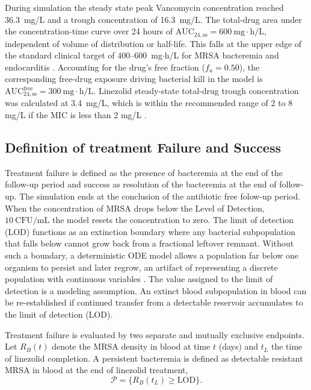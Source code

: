 \documentclass[utf8]{FrontiersinHarvard} %
\begin{document}
During simulation the steady state peak Vancomycin concentration reached 36.3~mg/L and a trough concentration of 16.3~mg/L.  The total-drug
area under the concentration-time curve over 24 hours of
$\mathrm{AUC}_{24,\mathrm{ss}} = 600~\mathrm{mg\cdot h/L}$,
independent of volume of distribution or half-life. This falls at the upper
edge of the standard clinical target of 400--600~mg$\cdot$h/L for MRSA
bacteremia and endocarditis \citep{rybak2020therapeutic}. Accounting for the drug's free fraction
($f_u = 0.50$), the corresponding free-drug exposure driving bacterial kill
in the model is $\mathrm{AUC}_{24,\mathrm{ss}}^{\text{free}} = 300~\mathrm{mg\cdot h/L}$.
Linezolid steady-state total-drug trough concentration was calculated at 3.4~mg/L,
which is within the recommended range of 2 to 8 mg/L if the MIC is less than 2 mg/L \citep{alsultan2019determining}.

\subsection{Definition of treatment Failure and Success}

Treatment failure is defined as the presence of bacteremia at the end of the follow-up period and success as resolution of the bacteremia at the end of follow-up.  The simulation ends at the conclusion of the antibiotic free folow-up period.  When the concentration of MRSA drops below the Level of Detection, $10~\mathrm{CFU/mL}$ the model resets the concentration to zero.  The limit of detection (LOD) functions as an extinction boundary where any bacterial subpopulation that falls below cannot grow back from a fractional leftover remnant. Without such a boundary, a deterministic ODE model allows a population far below one organism to persist and later regrow, an artifact of representing a discrete population with continuous variables \citep{Mollison1991,CampilloLobry2012}. The value assigned to the limit of detection is a modeling assumption.  An extinct blood subpopulation in blood can be re-established if continued transfer from a detectable reservoir accumulates to the limit of detection (LOD).

Treatment failure is evaluated by two separate and mutually exclusive endpoints.
Let $R_B(t)$ denote the MRSA density in blood at time $t$ (days) and $t_L$ the time of linezolid completion.
A persistent bacteremia is defined as detectable resistant MRSA in blood at
the end of linezolid treatment,
\begin{equation}
    \mathcal{P} = \Big\{ R_B(t_L) \ge \mathrm{LOD} \Big\}.
    \label{eq:persistence}
\end{equation}
\end{document}
